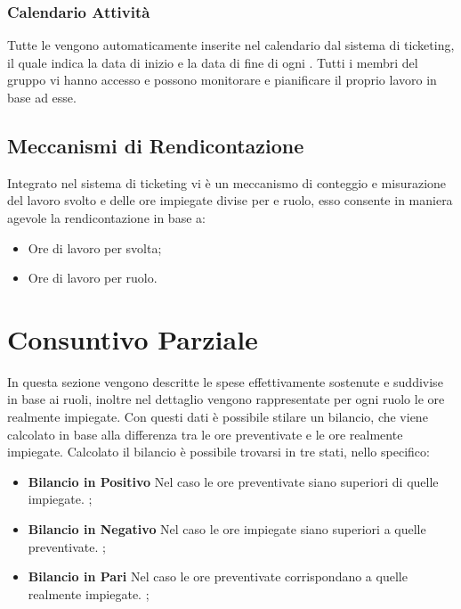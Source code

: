 \documentclass{scalatekids-article}
\begin{document}
\subsubsection{Calendario Attività}
Tutte le  vengono automaticamente inserite nel calendario dal sistema di ticketing, il quale
indica la data di inizio e la data di fine di ogni . Tutti i membri del gruppo vi hanno accesso
e possono monitorare e pianificare il proprio lavoro in base ad esse.
\subsection{Meccanismi di Rendicontazione}
Integrato nel sistema di ticketing vi è un meccanismo di conteggio e misurazione del lavoro svolto
e delle ore impiegate divise per  e ruolo, esso consente in maniera agevole la rendicontazione
in base a:
\begin{itemize}
\item{Ore di lavoro per  svolta;}
\item{Ore di lavoro per ruolo.}
\end{itemize}
\newpage
\section{Consuntivo Parziale}
In questa sezione vengono descritte le spese effettivamente sostenute e suddivise in base ai ruoli,
inoltre nel dettaglio vengono rappresentate per ogni ruolo le ore realmente impiegate. Con questi
dati è possibile stilare un bilancio, che viene calcolato in base alla differenza tra le ore preventivate
e le ore realmente impiegate.
Calcolato il bilancio è possibile trovarsi in tre stati, nello specifico:
\begin{itemize}
\item{\textbf{Bilancio in Positivo} Nel caso le ore preventivate siano superiori di quelle impiegate. ;}
\item{\textbf{Bilancio in Negativo} Nel caso le ore impiegate siano superiori a quelle preventivate. ;}
\item{\textbf{Bilancio in Pari} Nel caso le ore preventivate corrispondano a quelle realmente impiegate. ;}
\end{itemize}
\end{document}
